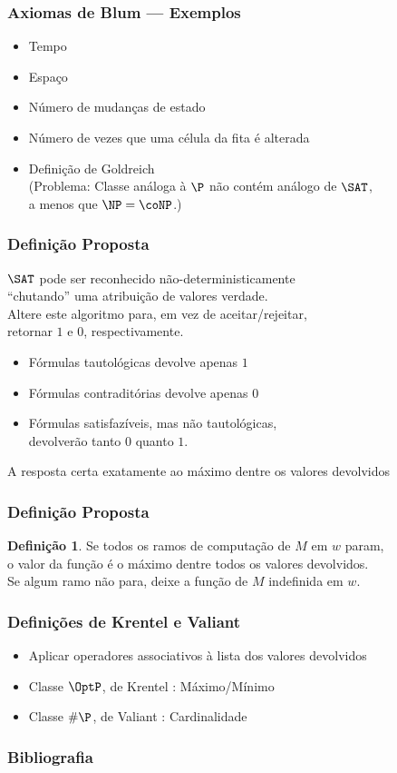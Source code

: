 \documentclass[utf8,notheorems]{beamer}
\theoremstyle{definition}
\newtheorem*{definition}{Definição}
\begin{document}
\begin{frame}
    \frametitle{Axiomas de Blum --- Exemplos}
    \begin{itemize}
        \item Tempo
        \item Espaço
        \item Número de mudanças de estado
        \item Número de vezes que uma célula da fita é alterada
        \item Definição de Goldreich \\
            (Problema: Classe análoga à $\P$ não contém análogo de $\SAT$, \\
            a menos que $\NP = \coNP$.)
    \end{itemize}
\end{frame}

\begin{frame}
    \frametitle{Definição Proposta}
    $\SAT$ pode ser reconhecido não-deterministicamente \\
    ``chutando'' uma atribuição de valores verdade. \\
    Altere este algoritmo para, em vez de aceitar/rejeitar, \\
    retornar $1$ e $0$, respectivamente.
    \begin{itemize}
        \item Fórmulas tautológicas devolve apenas $1$
        \item Fórmulas contraditórias devolve apenas $0$
        \item Fórmulas satisfazíveis, mas não tautológicas, \\
            devolverão tanto $0$ quanto $1$.
    \end{itemize}
    A resposta certa exatamente ao máximo dentre os valores devolvidos
\end{frame}

\begin{frame}
    \frametitle{Definição Proposta}
    \begin{definition}
        Se todos os ramos de computação de $M$ em $w$ param, \\
        o valor da função é o máximo dentre todos os valores devolvidos. \\
        Se algum ramo não para, deixe a função de $M$ indefinida em $w$.
    \end{definition}
\end{frame}

\begin{frame}
    \frametitle{Definições de Krentel e Valiant}
    \begin{itemize}
        \item Aplicar operadores associativos à lista dos valores devolvidos
        \item Classe $\OptP$, de Krentel \cite{Krentel1988}: Máximo/Mínimo
        \item Classe $\#\P$, de Valiant \cite{Valiant1979}: Cardinalidade
    \end{itemize}
\end{frame}

\begin{frame}[allowframebreaks]
    \frametitle{Bibliografia}
    
    
\end{frame}

\begin{frame}
    \titlepage
\end{frame}
\end{document}
